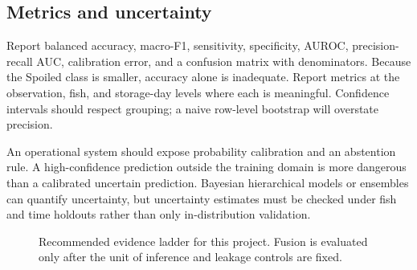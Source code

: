 \documentclass[11pt]{article}
\begin{document}
\subsection{Metrics and uncertainty}

Report balanced accuracy, macro-F1, sensitivity, specificity, AUROC, precision-recall AUC, calibration error, and a confusion matrix with denominators. Because the Spoiled class is smaller, accuracy alone is inadequate. Report metrics at the observation, fish, and storage-day levels where each is meaningful. Confidence intervals should respect grouping; a naive row-level bootstrap will overstate precision.

An operational system should expose probability calibration and an abstention rule. A high-confidence prediction outside the training domain is more dangerous than a calibrated uncertain prediction. Bayesian hierarchical models or ensembles can quantify uncertainty, but uncertainty estimates must be checked under fish and time holdouts rather than only in-distribution validation.

\begin{figure}[H]
\centering
{}
\caption{Recommended evidence ladder for this project. Fusion is evaluated only after the unit of inference and leakage controls are fixed.}
\label{fig:evaluation}
\end{figure}
\end{document}

